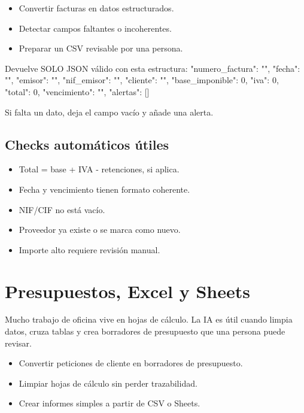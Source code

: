 \documentclass[11pt,a4paper]{book}
\begin{document}
\begin{itemize}\item Convertir facturas en datos estructurados.\end{itemize}
\begin{itemize}\item Detectar campos faltantes o incoherentes.\end{itemize}
\begin{itemize}\item Preparar un CSV revisable por una persona.\end{itemize}
\begin{codebox}
Devuelve SOLO JSON válido con esta estructura:
{
  "numero_factura": "",
  "fecha": "",
  "emisor": "",
  "nif_emisor": "",
  "cliente": "",
  "base_imponible": 0,
  "iva": 0,
  "total": 0,
  "vencimiento": "",
  "alertas": []
}

Si falta un dato, deja el campo vacío y añade una alerta.
\end{codebox}
\section{Checks automáticos útiles}
\begin{itemize}\item Total = base + IVA - retenciones, si aplica.\end{itemize}
\begin{itemize}\item Fecha y vencimiento tienen formato coherente.\end{itemize}
\begin{itemize}\item NIF/CIF no está vacío.\end{itemize}
\begin{itemize}\item Proveedor ya existe o se marca como nuevo.\end{itemize}
\begin{itemize}\item Importe alto requiere revisión manual.\end{itemize}
\chapter{Presupuestos, Excel y Sheets}
Mucho trabajo de oficina vive en hojas de cálculo. La IA es útil cuando limpia datos, cruza tablas y crea borradores de presupuesto que una persona puede revisar.

\begin{itemize}\item Convertir peticiones de cliente en borradores de presupuesto.\end{itemize}
\begin{itemize}\item Limpiar hojas de cálculo sin perder trazabilidad.\end{itemize}
\begin{itemize}\item Crear informes simples a partir de CSV o Sheets.\end{itemize}
\end{document}
